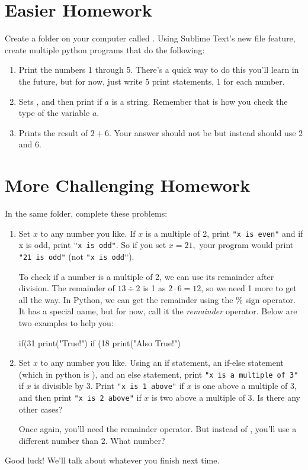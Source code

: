 \documentclass[12pt]{scrartcl}
\begin{document}
\section{Easier Homework}
Create a folder on your computer called . Using Sublime Text's new file feature, create multiple python programs that do the following:
\begin{enumerate}
    \item Print the numbers 1 through 5. There's a quick way to do this you'll learn in the future, but for now, just write 5 print statements, 1 for each number.
    \item Sets , and then print  if $a$ is a string. Remember that  is how you check the type of the variable $a$.
    \item Prints the result of $2 + 6.$ Your answer should not be  but instead should use $2$ and $6.$
\end{enumerate}

\newpage
\section{More Challenging Homework}

In the same folder, complete these problems:
\begin{enumerate}
    \item Set $x$ to any number you like. If $x$ is a multiple of 2, print \texttt{"x is even"} and if x is odd, print \texttt{"x is odd"}. So if you set $x = 21,$ your program would print \texttt{"21 is odd"} (not \texttt{"x is odd"}).
    
    To check if a number is a multiple of 2, we can use its remainder after division. The remainder of $13 \div 2$ is 1 as $2 \cdot 6 = 12$, so we need 1 more to get all the way. In Python, we can get the remainder using the $\%$ sign operator. It has a special name, but for now, call it the \textit{remainder} operator. Below are two examples to help you:
    \begin{python}
        if(31 %
            print("True!")
        if (18 %
            print("Also True!")
    \end{python}

    \item Set $x$ to any number you like. Using an if statement, an if-else statement (which in python is ), and an else statement, print \texttt{"x is a  multiple of 3"} if $x$ is divisible by 3. Print \texttt{"x is 1 above"} if $x$ is one above a multiple of 3, and then print \texttt{"x is 2 above"} if $x$ is two above a multiple of 3. Is there any other cases?
    
    Once again, you'll need the remainder operator. But instead of , you'll use a different number than 2. What number?
\end{enumerate}

Good luck! We'll talk about whatever you finish next time.
\end{document}
